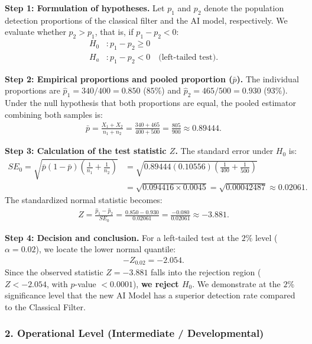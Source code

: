 \begin{solproblema}
	\textbf{Step 1: Formulation of hypotheses.}
	Let $p_1$ and $p_2$ denote the population detection proportions of the classical filter and the AI model, respectively. We evaluate whether $p_2 > p_1$, that is, if $p_1 - p_2 < 0$:
	\begin{align}
		H_0&: p_1 - p_2 \geq 0 \\
		H_a&: p_1 - p_2 < 0 \quad \text{(left-tailed test)}.
	\end{align}
	
	\textbf{Step 2: Empirical proportions and pooled proportion ($\bar{p}$).}
	The individual proportions are $\hat{p}_1 = 340/400 = 0.850$ ($85\%$) and $\hat{p}_2 = 465/500 = 0.930$ ($93\%$).
	Under the null hypothesis that both proportions are equal, the pooled estimator combining both samples is:
	\begin{align}
		\bar{p} = \frac{X_1 + X_2}{n_1 + n_2} = \frac{340 + 465}{400 + 500} = \frac{805}{900} \approx 0.89444.
	\end{align}
	
	\textbf{Step 3: Calculation of the test statistic $Z$.}
	The standard error under $H_0$ is:
	\begin{align}
		SE_0 = \sqrt{\bar{p}(1-\bar{p})\left(\frac{1}{n_1} + \frac{1}{n_2}\right)} &= \sqrt{0.89444(0.10556)\left(\frac{1}{400} + \frac{1}{500}\right)} \\
		&= \sqrt{0.094416 \times 0.0045} = \sqrt{0.00042487} \approx 0.02061.
	\end{align}
	The standardized normal statistic becomes:
	\begin{align}
		Z = \frac{\hat{p}_1 - \hat{p}_2}{SE_0} = \frac{0.850 - 0.930}{0.02061} = \frac{-0.080}{0.02061} \approx -3.881.
	\end{align}
	
	\textbf{Step 4: Decision and conclusion.}
	For a left-tailed test at the $2\%$ level ($\alpha = 0.02$), we locate the lower normal quantile:
	\begin{align}
		-Z_{0.02} = -2.054.
	\end{align}
	Since the observed statistic $Z = -3.881$ falls into the rejection region ($Z < -2.054$, with $p$-value $< 0.0001$), \textbf{we reject $H_0$}. We demonstrate at the $2\%$ significance level that the new AI Model has a superior detection rate compared to the Classical Filter.
\end{solproblema}

\subsubsection*{2. Operational Level (Intermediate / Developmental)}

